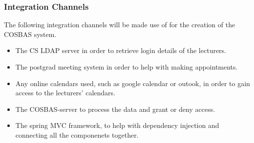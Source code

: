 \subsubsection{Integration Channels}
The following integration channels will be made use of for the creation of the COSBAS system.

\begin{itemize}
	\item The CS LDAP server in order to retrieve login details of the lecturers.
	\item The postgrad meeting system in order to help with making appointments.
	\item Any online calendars used, such as google calendar or outook, in order to gain access to the lecturers' calendars.
	\item The COSBAS-server to process the data and grant or deny access.
	\item The spring MVC framework, to help with dependency injection and connecting all the componenets together.
\end{itemize}